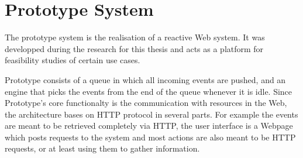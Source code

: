 
\chapter{Prototype System}


%

% 


The prototype system is the realisation of a reactive Web system.
It was developped during the research for this thesis and acts as a platform for feasibility studies of certain use cases.


Prototype consists of a queue in which all incoming events are pushed, and an engine that picks the events from the end of the queue whenever it is idle.
Since Prototype's core functionalty is the communication with resources in the Web, the architecture bases on HTTP protocol in several parts.
For example the events are meant to be retrieved completely via HTTP, the user interface is a Webpage which posts requests to the system and most actions are also meant to be HTTP requests, or at least using them to gather information.

